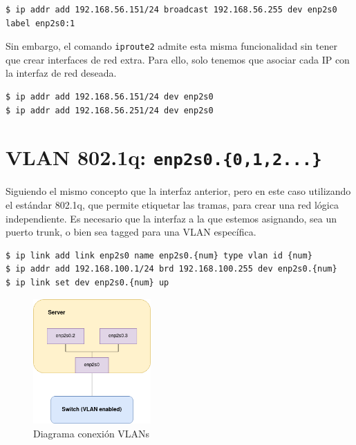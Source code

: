 \documentclass[a4paper, oneside, 12pt]{book}
\begin{document}
	\begin{verbatim}
$ ip addr add 192.168.56.151/24 broadcast 192.168.56.255 dev enp2s0 
label enp2s0:1
	\end{verbatim}

	\par \noindent Sin embargo, el comando \texttt{iproute2} admite esta misma funcionalidad sin tener que crear interfaces de red extra. Para ello, solo tenemos que asociar cada IP con la interfaz de red deseada.
	\begin{verbatim}
$ ip addr add 192.168.56.151/24 dev enp2s0
$ ip addr add 192.168.56.251/24 dev enp2s0
	\end{verbatim}

	\section{VLAN 802.1q: \texttt{enp2s0.\{0,1,2...\}}}
	\par \noindent Siguiendo el mismo concepto que la interfaz anterior, pero en este caso utilizando el estándar 802.1q, que permite etiquetar las tramas, para crear una red lógica independiente. Es necesario que la interfaz a la que estemos asignando, sea un puerto trunk, o bien sea tagged para una VLAN específica.
	
	\begin{verbatim}
$ ip link add link enp2s0 name enp2s0.{num} type vlan id {num}
$ ip addr add 192.168.100.1/24 brd 192.168.100.255 dev enp2s0.{num}
$ ip link set dev enp2s0.{num} up
	\end{verbatim}

	\begin{figure}[h!]
		\begin{center}
			\includegraphics[width=0.4\textwidth]{img/diag_vlan.png}
			\caption{Diagrama conexión VLANs}
		\end{center}
	\end{figure}

	\pagebreak
	
\end{document}
